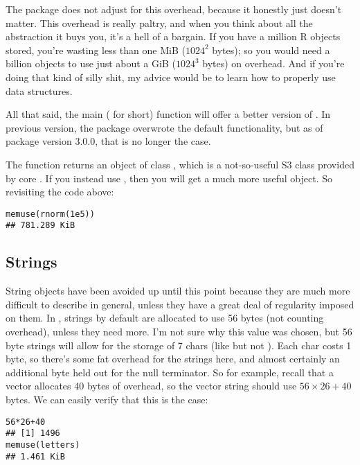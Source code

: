 The  package does not adjust for this overhead, because it 
honestly just doesn't matter.  This overhead is really paltry, and when you 
think about all the abstraction it buys you, it's a hell of a bargain.  If you 
have a million R objects stored, you're wasting less than one MiB ($1024^2$ 
bytes); so you would need a billion objects to use just about a GiB ($1024^3$ 
bytes) on overhead.  And if you're doing that kind of silly shit, my advice 
would be to learn how to properly use data structures.

All that said, the main  ( for short) function
will offer a better version of .  In previous 
version, the package overwrote the default functionality, but as of
package version 3.0.0, that is no longer the case. 

The  function returns an object of class 
, which is a not-so-useful S3 class provided by core 
\R.  If you instead use , then you will get a much more useful
 object.  So revisiting the code above:
\begin{lstlisting}[language=rr]
memuse(rnorm(1e5))
## 781.289 KiB
\end{lstlisting}



\subsection{Strings}

String objects have been avoided up until this point because they are much more 
difficult to describe in general, unless they have a great deal of regularity 
imposed on them.  In \R, strings by default are allocated to use 56 
bytes (not counting overhead), unless they need more.  I'm not sure why this 
value was chosen, but 56 byte strings will allow for the storage of 7 chars 
(like  but not ).  Each char costs 1 byte, so there's some fat 
overhead for the strings here, and almost certainly an additional byte held out 
for the null terminator.  So for example, recall that a vector allocates 40 
bytes of overhead, so the vector string  should use $56\times 26 + 
40$ bytes.  We can easily verify that this is the case:
\begin{lstlisting}[language=rr]
56*26+40
## [1] 1496
memuse(letters)
## 1.461 KiB
\end{lstlisting}

